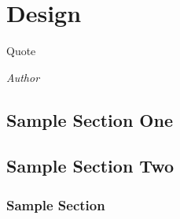 \documentclass[class=report,11pt,crop=false]{standalone}
\begin{document}
\chapter{Design}
\epigraph{Quote}%
    {\emph{Author}}

\section{Sample Section One}

\blindmathpaper

\section{Sample Section Two}

\blindmathpaper

\subsection{Sample Section}

\blindtext












\ifstandalone

\fi
\end{document}
